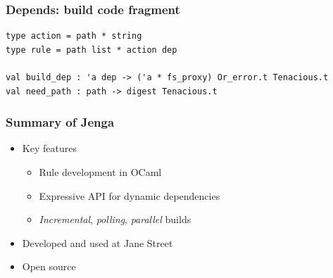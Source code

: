 \documentclass{beamer}
\begin{document}


\begin{frame}[fragile]
\frametitle{Depends: build code fragment}
{\footnotesize
\begin{verbatim}
type action = path * string
type rule = path list * action dep

val build_dep : 'a dep -> ('a * fs_proxy) Or_error.t Tenacious.t
val need_path : path -> digest Tenacious.t

\end{verbatim}}
\end{frame}


% 
% 


\begin{frame}[fragile]
\frametitle{Summary of Jenga}
\begin{itemize}
\item Key features
\begin{itemize}
\item Rule development in OCaml
\item Expressive API for dynamic dependencies
\item {\em Incremental}, {\em polling}, {\em parallel}\/ builds
\end{itemize}
\item Developed and used at Jane Street
\item Open source
\begin{center}
\end{center}
\vskip12pt
\end{itemize}
\end{frame}
\end{document}
